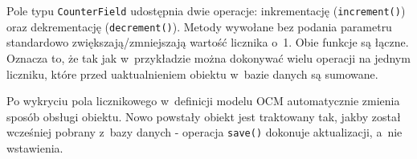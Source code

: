 Pole typu \verb+CounterField+ udostępnia dwie operacje: inkrementację (\verb+increment()+) oraz dekrementację (\verb+decrement()+). Metody wywołane bez podania parametru standardowo zwiększają/zmniejszają wartość licznika o~1. Obie funkcje są łączne. Oznacza to, że tak jak w~przykładzie można dokonywać wielu operacji na jednym liczniku, które przed uaktualnieniem obiektu w~bazie danych są sumowane.

Po wykryciu pola licznikowego w~definicji modelu OCM automatycznie zmienia sposób obsługi obiektu. Nowo powstały obiekt jest traktowany tak, jakby został wcześniej pobrany z~bazy danych - operacja \verb+save()+ dokonuje aktualizacji, a~nie wstawienia. 